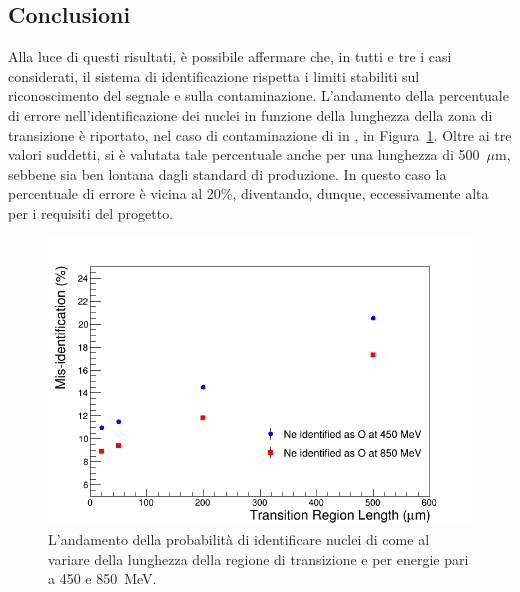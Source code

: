 \subsection*{Conclusioni}


Alla luce di questi risultati, è possibile affermare che, in tutti e tre i casi considerati, il sistema di identificazione rispetta i limiti stabiliti sul riconoscimento del segnale e sulla contaminazione.
L'andamento della percentuale di errore nell'identificazione dei nuclei in funzione della lunghezza della zona di transizione è riportato, nel caso di contaminazione di  in , in Figura~\ref{fig:misident_vs_length}.
Oltre ai tre valori suddetti, si è valutata tale percentuale anche per una lunghezza di 500~$\mu$m, sebbene sia ben lontana dagli standard di produzione.
In questo caso la percentuale di errore è vicina al 20\%, diventando, dunque, eccessivamente alta per i requisiti del progetto.







\begin{figure} [!t]
	\centering
	\includegraphics[width=\textwidth, keepaspectratio]{Grafici_Tesi/Cornice/misident_length2.png}
	\caption{L'andamento della probabilità di identificare nuclei di  come  al variare della lunghezza della regione di transizione e per energie pari a 450 e 850~MeV.} \label{fig:misident_vs_length}
\end{figure}



